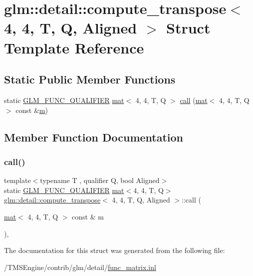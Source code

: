 \hypertarget{structglm_1_1detail_1_1compute__transpose_3_014_00_014_00_01_t_00_01_q_00_01_aligned_01_4}{}\section{glm\+:\+:detail\+:\+:compute\+\_\+transpose$<$ 4, 4, T, Q, Aligned $>$ Struct Template Reference}
\label{structglm_1_1detail_1_1compute__transpose_3_014_00_014_00_01_t_00_01_q_00_01_aligned_01_4}
\subsection*{Static Public Member Functions}
\begin{DoxyCompactItemize}
\item 
static \hyperlink{setup_8hpp_a33fdea6f91c5f834105f7415e2a64407}{G\+L\+M\+\_\+\+F\+U\+N\+C\+\_\+\+Q\+U\+A\+L\+I\+F\+I\+ER} \hyperlink{structglm_1_1mat}{mat}$<$ 4, 4, T, Q $>$ \hyperlink{structglm_1_1detail_1_1compute__transpose_3_014_00_014_00_01_t_00_01_q_00_01_aligned_01_4_a1c83bd028bacc75a9992bae671fdace4}{call} (\hyperlink{structglm_1_1mat}{mat}$<$ 4, 4, T, Q $>$ const \&\hyperlink{_s_d_l__opengl__glext_8h_af593500c283bf1a787a6f947f503a5c2}{m})
\end{DoxyCompactItemize}


\subsection{Member Function Documentation}
\mbox{\label{structglm_1_1detail_1_1compute__transpose_3_014_00_014_00_01_t_00_01_q_00_01_aligned_01_4_a1c83bd028bacc75a9992bae671fdace4}} 
\subsubsection{\texorpdfstring{call()}{call()}}
{\footnotesize\ttfamily template$<$typename T , qualifier Q, bool Aligned$>$ \\
static \hyperlink{setup_8hpp_a33fdea6f91c5f834105f7415e2a64407}{G\+L\+M\+\_\+\+F\+U\+N\+C\+\_\+\+Q\+U\+A\+L\+I\+F\+I\+ER} \hyperlink{structglm_1_1mat}{mat}$<$4, 4, T, Q$>$ \hyperlink{structglm_1_1detail_1_1compute__transpose}{glm\+::detail\+::compute\+\_\+transpose}$<$ 4, 4, T, Q, Aligned $>$\+::call (\begin{DoxyParamCaption}\item[{\hyperlink{structglm_1_1mat}{mat}$<$ 4, 4, T, Q $>$ const \&}]{m }\end{DoxyParamCaption})\hspace{0.3cm}{\ttfamily [inline]}, {\ttfamily [static]}}



The documentation for this struct was generated from the following file\+:\begin{DoxyCompactItemize}
\item 
/\+T\+M\+S\+Engine/contrib/glm/detail/\hyperlink{func__matrix_8inl}{func\+\_\+matrix.\+inl}\end{DoxyCompactItemize}
